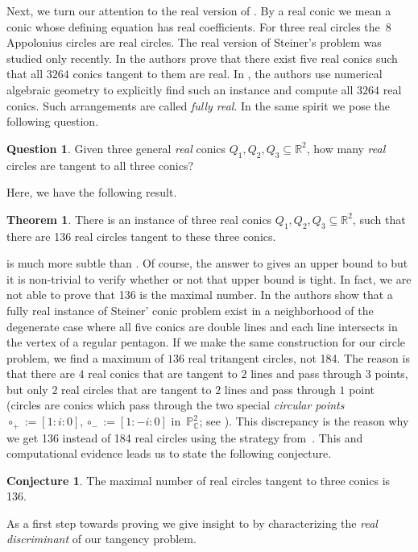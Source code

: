 \documentclass[12pt]{amsart}
\theoremstyle{definition}
\newtheorem{conj}[thm]{Conjecture}
\theoremstyle{definition}
\newtheorem{theorem}[thm]{Theorem}
\newtheorem{question}[thm]{Question}
\numberwithin{equation}{section}
\begin{document}
Next, we turn our attention to the real version of .
By a real conic we mean a conic whose defining equation has real coefficients.
For three real circles the~8 Appolonius circles are real circles. The real version of Steiner's problem was studied only recently. In \cite{3264RealConics} the authors prove that there exist five real conics such that all $3264$ conics tangent to them are real. In \cite{breiding20203264}, the authors use numerical algebraic geometry to explicitly find such an instance and compute all $3264$ real conics. Such arrangements are called \emph{fully real}. In the same spirit we pose the following question.
\begin{question}\label{ques:R_circles}
    Given three general \emph{real} conics $Q_1,Q_2,Q_3 \subseteq \mathbb{R}^2$, how many \emph{real} circles are tangent to all three conics?
\end{question}
Here, we have the following result. 
\begin{theorem}\label{thm:136_R_intro}
There is an instance of three real conics $Q_1,Q_2,Q_3 \subseteq \mathbb{R}^2$, such that there are 136 real circles tangent to these three conics.
\end{theorem}
 is much more subtle than . Of course, the answer to  gives an upper bound to  but it is non-trivial to verify whether or not that upper bound is tight.
In fact, we are not able to prove that 136 is the maximal number. In \cite{3264RealConics} the authors show that a fully real instance of Steiner' conic problem  exist in a neighborhood of the degenerate case where all five conics are double lines and each line intersects in the vertex of a regular pentagon. If we make the same construction for our circle problem, we find a maximum of $136$ real tritangent circles, not 184. The reason is that there are $4$ real conics that are tangent to $2$ lines and pass through $3$ points, but only $2$ real circles that are tangent to $2$ lines and pass through $1$ point \cite{CirclesAndSpheres} (circles are conics which pass through the two special \emph{circular points} $\circ_{+}:=[1:i:0], \circ_{-}:=[1:-i:0]$ in~$\mathbb{P}^{2}_{\mathbb{C}}$; see ). This discrepancy is the reason why we get 136 instead of 184 real circles using the strategy from~\cite{3264RealConics}. This and computational evidence leads us to state the following conjecture.
\begin{conj}\label{conj_real}
The maximal number of real circles tangent to three conics is 136.
\end{conj}
As a first step towards proving  we give insight to  by characterizing the \emph{real discriminant} of our tangency problem.
\end{document}
